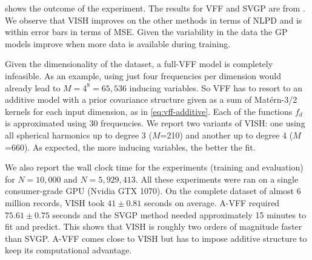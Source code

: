  shows the outcome of the experiment. The results for VFF and SVGP are from \citet{hensman2017variational}. We observe that VISH improves on the other methods in terms of NLPD and is within error bars in terms of MSE. Given the variability in the data the GP models improve when more data is available during training.

Given the dimensionality of the dataset, a full-VFF model is completely infeasible. As an example, using just four frequencies per dimension would already lead to $M = 4^8 = 65,536$ inducing variables. So VFF has to resort to an additive model with a prior covariance structure given as a sum of Mat\'ern-3/2 kernels for each input dimension, as in \cref{eq:vff-additive}. Each of the functions $f_d$ is approximated using 30 frequencies.
We report two variants of VISH: one using all spherical harmonics up to degree 3 ($M$=210) and another up to degree 4 ($M$=660). As expected, the more inducing variables, the better the fit.

We also report the wall clock time for the experiments (training and evaluation) for $N=10,000$ and $N=5,929,413$. All these experiments were ran on a single consumer-grade GPU (Nvidia GTX 1070). On the complete dataset of almost 6 million records, VISH took $41\pm0.81$ seconds on average. A-VFF required $75.61\pm0.75$ seconds and the SVGP method needed approximately 15 minutes to fit and predict. This shows that VISH is roughly two orders of magnitude faster than SVGP. A-VFF comes close to VISH but has to impose additive structure to keep its computational advantage.